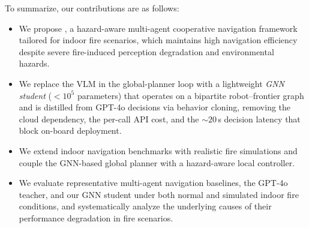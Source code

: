 
To summarize, our contributions are as follows:
\begin{itemize}
    \item We propose \system, a hazard-aware multi-agent cooperative navigation framework tailored for indoor fire scenarios, which maintains high navigation efficiency despite severe fire-induced perception degradation and environmental hazards.
    \item We replace the VLM in the global-planner loop with a lightweight \emph{GNN student} ($<\!10^5$ parameters) that operates on a bipartite robot--frontier graph and is distilled from GPT-4o decisions via behavior cloning, removing the cloud dependency, the per-call API cost, and the ${\sim}20$\,s decision latency that block on-board deployment.
    \item We extend indoor navigation benchmarks with realistic fire simulations and couple the GNN-based global planner with a hazard-aware local controller.
    \item We evaluate representative multi-agent navigation baselines, the GPT-4o teacher, and our GNN student under both normal and simulated indoor fire conditions, and systematically analyze the underlying causes of their performance degradation in fire scenarios.
\end{itemize}



